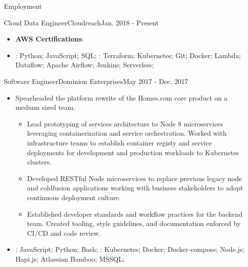 \documentclass[]{mcdowellcv}
\begin{document}
\begin{cvsection}{Employment}
\begin{cvsubsection}{Cloud Data Engineer}{Cloudreach}{Jan. 2018 - Present}
\begin{itemize}
\begin{itemize}
                        \item \textbf{AWS Certifications}: 
                    \end{itemize}
                \end{itemize}
            \begin{itemize}
                 \item {}: Python; JavaScript; SQL; \newline
                 : Terraform; Kubernetes; Git; Docker; Lambda; Dataflow; Apache Airflow; Jenkins; Serverless;
            \end{itemize}
        \end{cvsubsection}

        \begin{cvsubsection}{Software Engineer}{Dominion Enterprises}{May 2017 - Dec. 2017}
            \begin{itemize}
                \item Spearheaded the platform rewrite of the Homes.com core product on a medium sized team.
                \begin{itemize}
                    \item Lead prototyping of services architecture to Node 8 microservices leveraging containerization and service orchestration. Worked with infrastructure teams to establish container registy and service deployments for development and production workloads to Kubernetes clusters.
                    \item Developed RESTful Node microservices to replace previous legacy node and coldfusion applications working with business stakeholders to adopt continuous deployment culture.
                    \item Established developer standards and workflow practices for the backend team. Created tooling, style guidelines, and documentation enforced by CI/CD and code review.
                \end{itemize}
            \end{itemize}
            \begin{itemize}
                 \item {}: JavaScript; Python; Bash;  \newline
                : Kubernetes; Docker; Docker-compose; Node.js; Hapi.js; Atlassian Bamboo; MSSQL;
            \end{itemize}
        \end{cvsubsection}


\end{cvsection}
\end{document}
